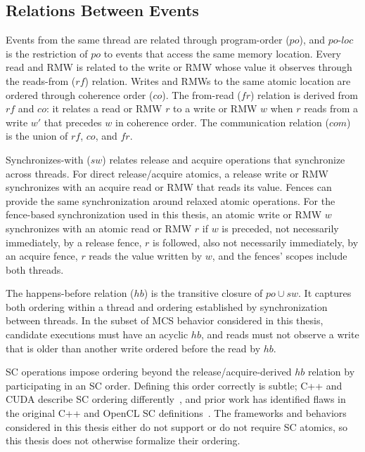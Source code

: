 \subsection{Relations Between Events}

Events from the same thread are related through program-order ($po$), and $\textit{po-loc}$ is the restriction of $po$ to events that access the same memory location. Every read and RMW is related to the write or RMW whose value it observes through the reads-from ($rf$) relation. Writes and RMWs to the same atomic location are ordered through coherence order ($co$). The from-read ($fr$) relation is derived from $rf$ and $co$: it relates a read or RMW $r$ to a write or RMW $w$ when $r$ reads from a write $w'$ that precedes $w$ in coherence order. The communication relation ($com$) is the union of $rf$, $co$, and $fr$.

Synchronizes-with ($sw$) relates release and acquire operations that synchronize across threads. For direct release/acquire atomics, a release write or RMW synchronizes with an acquire read or RMW that reads its value. Fences can provide the same synchronization around relaxed atomic operations. For the fence-based synchronization used in this thesis, an atomic write or RMW $w$ synchronizes with an atomic read or RMW $r$ if $w$ is preceded, not necessarily immediately, by a release fence, $r$ is followed, also not necessarily immediately, by an acquire fence, $r$ reads the value written by $w$, and the fences' scopes include both threads.

The happens-before relation ($hb$) is the transitive closure of $po \cup sw$. It captures both ordering within a thread and ordering established by synchronization between threads. In the subset of MCS behavior considered in this thesis, candidate executions must have an acyclic $hb$, and reads must not observe a write that is older than another write ordered before the read by $hb$.

SC operations impose ordering beyond the release/acquire-derived $hb$ relation by participating in an SC order. Defining this order correctly is subtle; C++ and CUDA describe SC ordering differently~\cite{batty2011mathematizing,lustig2019ptx}, and prior work has identified flaws in the original C++ and OpenCL SC definitions~\cite{batty2016overhauling,lahav2017repairingc11}. The frameworks and behaviors considered in this thesis either do not support or do not require SC atomics, so this thesis does not otherwise formalize their ordering.

